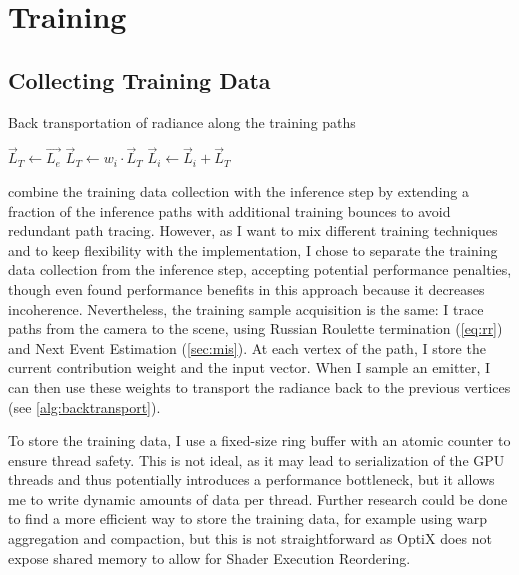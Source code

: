 \section{Training}

\subsection{Collecting Training Data}
\begin{algorithm}
    \caption{Back transportation of radiance along the training paths}
    \label{alg:backtransport}
    \begin{algorithmic}
        \State $\vec{L}_T \gets \vec{L_e}$
            \State $\vec{L}_T \gets w_i \cdot \vec{L}_T$ 
            \State $\vec{L}_i \gets \vec{L}_i + \vec{L}_T$ 
        \EndFor
    \end{algorithmic}
\end{algorithm}
\textcite{muller2021} combine the training data collection with the inference step by extending a fraction of the inference paths with additional training bounces to avoid redundant path tracing.
However, as I want to mix different training techniques and to keep flexibility with the implementation, I chose to separate the training data collection from the inference step, accepting potential performance penalties, though \textcite{dereviannykh2024} even found performance benefits in this approach because it decreases incoherence.
Nevertheless, the training sample acquisition is the same:
I trace paths from the camera to the scene, using Russian Roulette termination (\autoref{eq:rr}) and Next Event Estimation (\autoref{sec:mis}).
At each vertex of the path, I store the current contribution weight and the input vector.
When I sample an emitter, I can then use these weights to transport the radiance back to the previous vertices (see \autoref{alg:backtransport}).

To store the training data, I use a fixed-size ring buffer with an atomic counter to ensure thread safety.
This is not ideal, as it may lead to serialization of the GPU threads and thus potentially introduces a performance bottleneck, but it allows me to write dynamic amounts of data per thread.
Further research could be done to find a more efficient way to store the training data, for example using warp aggregation and compaction, but this is not straightforward as OptiX does not expose shared memory to allow for Shader Execution Reordering.

